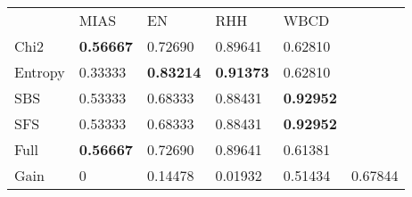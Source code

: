 \begin{tabular}{|l|l|l|l|l|l}
\cline{1-5}
        & MIAS              & EN                & RHH               & WBCD      &         \\
\cline{1-5}
Chi2    & \textbf{0.56667}  & 0.72690           & 0.89641           & 0.62810           &         \\
Entropy & 0.33333           & \textbf{0.83214}  & \textbf{0.91373}  & 0.62810           &         \\
SBS     & 0.53333           & 0.68333           & 0.88431           & \textbf{0.92952}  &         \\
SFS     & 0.53333           & 0.68333           & 0.88431           & \textbf{0.92952}  &         \\
Full    & \textbf{0.56667}  & 0.72690           & 0.89641           & 0.61381           &         \\
\cline{1-5}
\cline{1-5}
Gain    & 0                 & 0.14478           & 0.01932           & 0.51434           & 0.67844 \\
\cline{1-5}
\end{tabular}
